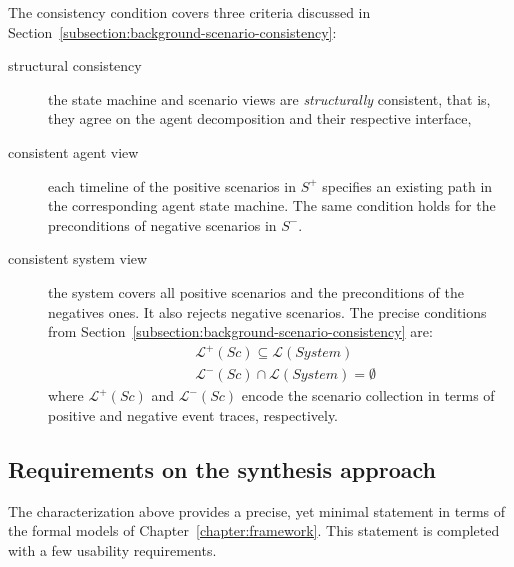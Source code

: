\noindent The consistency condition covers three criteria discussed in Section~\ref{subsection:background-scenario-consistency}:
\begin{description}
\item[structural consistency] the state machine and scenario views are \emph{structurally} consistent, that is, they agree on the agent decomposition and their respective interface,

\item[consistent agent view] each timeline of the positive scenarios in $S^+$ specifies an existing path in the corresponding agent state machine. The same condition holds for the preconditions of negative scenarios in $S^-$.

\item[consistent system view] the system covers all positive scenarios and the preconditions of the negatives ones. It also rejects negative scenarios. The precise conditions from Section~\ref{subsection:background-scenario-consistency} are:
\begin{align}
&\mathcal{L}^+(Sc) \subseteq \mathcal{L}(System) \\
&\mathcal{L}^-(Sc) \cap \mathcal{L}(System) = \emptyset
\label{relation:inductive-statement-negative}
\end{align}
\noindent where $\mathcal{L}^+(Sc)$ and $\mathcal{L}^-(Sc)$ encode the scenario collection in terms of positive and negative event traces, respectively.

\end{description}


\subsection{Requirements on the synthesis approach\label{subsection:inductive-synthesis-requirements}}

The characterization above provides a precise, yet minimal statement in terms of the formal models of Chapter~\ref{chapter:framework}. This statement is completed with a few usability requirements.

